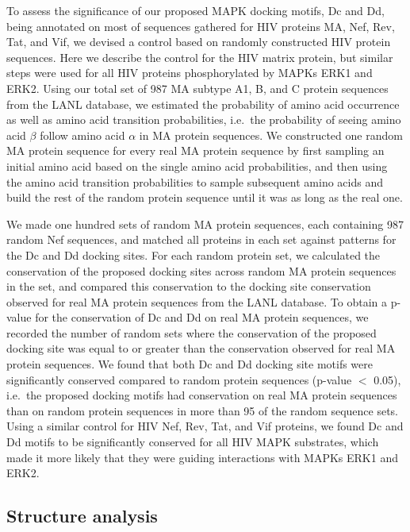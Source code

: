 To assess the significance of our proposed MAPK docking motifs, Dc and
Dd, being annotated on most of sequences gathered for HIV proteins MA,
Nef, Rev, Tat, and Vif, we devised a control based on randomly
constructed HIV protein sequences. Here we describe the control for
the HIV matrix protein, but similar steps were used for all HIV
proteins phosphorylated by MAPKs ERK1 and ERK2. Using our total set of
987 MA subtype A1, B, and C protein sequences from the LANL database,
we estimated the probability of amino acid occurrence as well as amino
acid transition probabilities, i.e.\ the probability of seeing amino
acid $\beta$ follow amino acid $\alpha$ in MA protein sequences. We
constructed one random MA protein sequence for every real MA protein
sequence by first sampling an initial amino acid based on the single
amino acid probabilities, and then using the amino acid transition
probabilities to sample subsequent amino acids and build the rest of
the random protein sequence until it was as long as the real one.

We made one hundred sets of random MA protein sequences, each
containing 987 random Nef sequences, and matched all proteins in each
set against patterns for the Dc and Dd docking sites. For each random
protein set, we calculated the conservation of the proposed docking
sites across random MA protein sequences in the set, and compared this
conservation to the docking site conservation observed for real MA
protein sequences from the LANL database. To obtain a p-value for the
conservation of Dc and Dd on real MA protein sequences, we recorded
the number of random sets where the conservation of the proposed
docking site was equal to or greater than the conservation observed
for real MA protein sequences. We found that both Dc and Dd docking
site motifs were significantly conserved compared to random protein
sequences (p-value $<$ 0.05), i.e.\ the proposed docking motifs had
conservation on real MA protein sequences than on random protein
sequences in more than 95 of the random sequence sets. Using a similar
control for HIV Nef, Rev, Tat, and Vif proteins, we found Dc and Dd
motifs to be significantly conserved for all HIV MAPK substrates,
which made it more likely that they were guiding interactions with
MAPKs ERK1 and ERK2.

\subsection{Structure analysis}

